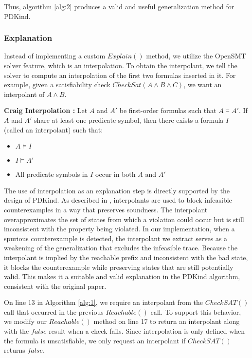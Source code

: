 \noindent Thus, algorithm \ref{alg:2} produces a valid and useful generalization method for PDKind.

\subsubsection*{Explanation} \label{Explain}
\noindent Instead of implementing a custom \( Explain() \) method, we utilize
the OpenSMT solver feature, which is an interpolation. To obtain the
interpolant, we tell the solver to compute an interpolation of the first two
formulas inserted in it. For example, given a satisfiability check $CheckSat(A
\land B \land C)$, we want an interpolant of $A \land B$.

\begin{definition}\textbf{Craig Interpolation \cite{7fb35eae-c1f2-3be3-bbd7-8ec25936313a}:}
Let \( A \) and \( A' \) be first-order formulas such that \( A \models A' \).  
If \( A \) and \( A' \) share at least one predicate symbol, then there exists a formula \( I \) (called an interpolant) such that:
\begin{itemize}
    \item \( A \models I \)
    \item \( I \models A' \)
    \item All predicate symbols in \( I \) occur in both \( A \) and \( A' \)
\end{itemize}
\end{definition}

\noindent The use of interpolation as an explanation step is directly supported by the
design of PDKind. As described in \cite{7886665}, interpolants are used to
block infeasible counterexamples in a way that preserves soundness. The
interpolant overapproximates the set of states from which a violation could
occur but is still inconsistent with the property being violated. In our
implementation, when a spurious counterexample is detected, the interpolant we
extract serves as a weakening of the generalization that excludes the
infeasible trace. Because the interpolant is implied by the reachable prefix
and inconsistent with the bad state, it blocks the counterexample while
preserving states that are still potentially valid. This makes it a suitable
and valid explanation in the PDKind algorithm, consistent with the original
paper.

On line 13 in Algorithm \ref{alg:1}, we require an
interpolant from the \( CheckSAT() \) call that occurred in the previous \(
Reachable() \) call. To support this behavior, we modify our \( Reachable() \)
method on line 17 to return an interpolant along with the \( false \) result
when a check fails. Since interpolation is only defined when the formula is
unsatisfiable, we only request an interpolant if \( CheckSAT() \) returns \(
false \).

